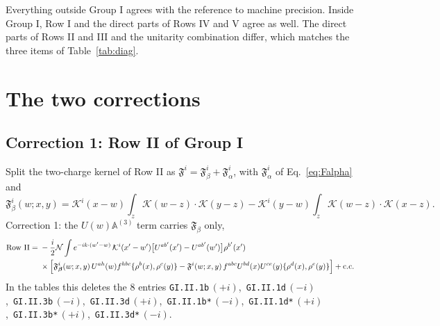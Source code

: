 \documentclass[10pt]{article}
\numberwithin{equation}{section}
\newcommand{\KK}{\mathcal K}
\newcommand{\NN}{\mathcal N}
\newcommand{\lab}[1]{\texttt{#1}}
\begin{document}
Everything outside Group I agrees with the reference to machine precision. Inside Group I, Row I and the direct parts of Rows IV and V agree as well. The direct parts of Rows II and III and the unitarity combination differ, which matches the three items of Table~\ref{tab:diag}.

\section{The two corrections}\label{sec:corrections}

\subsection{Correction 1: Row II of Group I}
Split the two-charge kernel of Row II as $\mathfrak F^i=\mathfrak F^i_\beta+\mathfrak F^i_\alpha$, with $\mathfrak F^i_\alpha$ of Eq.~\eqref{eq:Falpha} and
\begin{equation}
\mathfrak F^i_\beta(w;x,y)=\KK^i(x-w)\int_z\KK(w-z)\cdot\KK(y-z)-\KK^i(y-w)\int_z\KK(w-z)\cdot\KK(x-z).
\end{equation}
Correction 1: the $U(w)\mathbb A^{(3)}$ term carries $\mathfrak F_\beta$ only,
\begin{align}
\text{Row II}={}&-\frac i2\NN\int e^{-ik\cdot(w'-w)}\,\KK^i(x'-w')\big[U^{ab'}(x')-U^{ab'}(w')\big]\rho^{b'}(x')\notag\\
&\times\Big[\mathfrak F^i_{\boldsymbol\beta}(w;x,y)\,U^{ah}(w)f^{hbc}\{\rho^b(x),\rho^c(y)\}-\mathfrak F^i(w;x,y)\,f^{abc}U^{bd}(x)U^{ce}(y)\{\rho^d(x),\rho^e(y)\}\Big]+{\rm c.c.}
\label{eq:RowIIcorr}
\end{align}
In the tables this deletes the 8 entries \lab{GI.II.1b}\,$(+i)$,\ \lab{GI.II.1d}\,$(-i)$,\ \lab{GI.II.3b}\,$(-i)$,\ \lab{GI.II.3d}\,$(+i)$,\ \lab{GI.II.1b*}\,$(-i)$,\ \lab{GI.II.1d*}\,$(+i)$,\ \lab{GI.II.3b*}\,$(+i)$,\ \lab{GI.II.3d*}\,$(-i)$.
\end{document}
